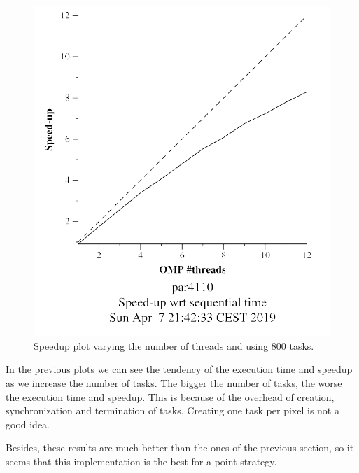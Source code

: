 \documentclass[12pt, a4paper]{article}
\begin{document}
\begin{figure}[H]
\begin{minipage}[t]{0.48\linewidth}
  \includegraphics[scale=0.5]{./mandel-omp-10000-strong-omp-24-800-speedup}
  \caption{Speedup plot varying the number of threads and using 800 tasks.}
  \label{fig:mandel-omp-10000-strong-omp-24-800-speedup}
\end{minipage}
\end{figure}

In the previous plots we can see the tendency of the execution time and speedup as we increase the number of tasks. The bigger the number of tasks, the worse the execution time and speedup. This is because of the overhead of creation, synchronization and termination of tasks. Creating one task per pixel is not a good idea.

Besides, these results are much better than the ones of the previous section, so it seems that this implementation is the best for a point strategy.
\end{document}
